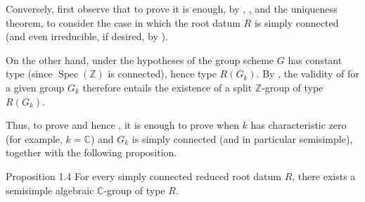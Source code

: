 Conversely, first observe that to prove  it is enough, by ,
, and the uniqueness theorem, to consider the case in which the root datum \(R\) is
simply connected (and even irreducible, if desired, by ).

On the other hand, under the hypotheses of  the group scheme \(G\) has
constant type (since \(\operatorname{Spec}(\mathbb Z)\) is connected), hence type
\(R(G_k)\). By , the validity of  for a given group \(G_k\)
therefore entails the existence of a split \(\mathbb Z\)-group of type
\(R(G_k)\).

Thus, to prove  and hence , it is enough to prove  when \(k\) has
characteristic zero (for example, \(k=\mathbb C\)) and \(G_k\) is simply
connected (and in particular semisimple), together with the following
proposition.

\begin{sgastatement}{Proposition 1.4}
For every simply connected reduced root datum \(R\), there exists a semisimple
algebraic \(\mathbb C\)-group of type \(R\).
\end{sgastatement}


